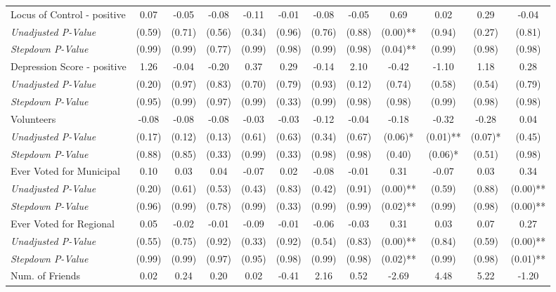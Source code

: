 \begin{tabular}{l c c c c c c c c c c c}
Locus of Control - positive & 0.07 & -0.05 & -0.08 & -0.11 & -0.01 & -0.08 & -0.05 & 0.69 & 0.02 & 0.29 & -0.04 \\
\quad \textit{Unadjusted P-Value} & (0.59) & (0.71) & (0.56) & (0.34) & (0.96) & (0.76) & (0.88) & (0.00)** & (0.94) & (0.27) & (0.81) \\
\quad \textit{Stepdown P-Value} & (0.99) & (0.99) & (0.77) & (0.99) & (0.98) & (0.99) & (0.98) & (0.04)** & (0.99) & (0.98) & (0.98) \\
Depression Score - positive & 1.26 & -0.04 & -0.20 & 0.37 & 0.29 & -0.14 & 2.10 & -0.42 & -1.10 & 1.18 & 0.28 \\
\quad \textit{Unadjusted P-Value} & (0.20) & (0.97) & (0.83) & (0.70) & (0.79) & (0.93) & (0.12) & (0.74) & (0.58) & (0.54) & (0.79) \\
\quad \textit{Stepdown P-Value} & (0.95) & (0.99) & (0.97) & (0.99) & (0.33) & (0.99) & (0.98) & (0.98) & (0.99) & (0.98) & (0.98) \\
Volunteers & -0.08 & -0.08 & -0.08 & -0.03 & -0.03 & -0.12 & -0.04 & -0.18 & -0.32 & -0.28 & 0.04 \\
\quad \textit{Unadjusted P-Value} & (0.17) & (0.12) & (0.13) & (0.61) & (0.63) & (0.34) & (0.67) & (0.06)* & (0.01)** & (0.07)* & (0.45) \\
\quad \textit{Stepdown P-Value} & (0.88) & (0.85) & (0.33) & (0.99) & (0.33) & (0.98) & (0.98) & (0.40) & (0.06)* & (0.51) & (0.98) \\
Ever Voted for Municipal & 0.10 & 0.03 & 0.04 & -0.07 & 0.02 & -0.08 & -0.01 & 0.31 & -0.07 & 0.03 & 0.34 \\
\quad \textit{Unadjusted P-Value} & (0.20) & (0.61) & (0.53) & (0.43) & (0.83) & (0.42) & (0.91) & (0.00)** & (0.59) & (0.88) & (0.00)** \\
\quad \textit{Stepdown P-Value} & (0.96) & (0.99) & (0.78) & (0.99) & (0.33) & (0.99) & (0.99) & (0.02)** & (0.99) & (0.98) & (0.00)** \\
Ever Voted for Regional & 0.05 & -0.02 & -0.01 & -0.09 & -0.01 & -0.06 & -0.03 & 0.31 & 0.03 & 0.07 & 0.27 \\
\quad \textit{Unadjusted P-Value} & (0.55) & (0.75) & (0.92) & (0.33) & (0.92) & (0.54) & (0.83) & (0.00)** & (0.84) & (0.59) & (0.00)** \\
\quad \textit{Stepdown P-Value} & (0.99) & (0.99) & (0.97) & (0.95) & (0.98) & (0.99) & (0.98) & (0.02)** & (0.99) & (0.98) & (0.01)** \\
Num. of Friends & 0.02 & 0.24 & 0.20 & 0.02 & -0.41 & 2.16 & 0.52 & -2.69 & 4.48 & 5.22 & -1.20 \\

\end{tabular}
